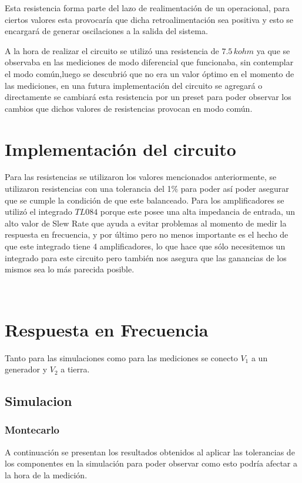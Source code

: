 	Esta resistencia forma parte del lazo de realimentación de un operacional, para ciertos valores esta provocaría que dicha retroalimentación sea positiva y esto se encargará de generar oscilaciones a la salida del sistema.
	
	A la hora de realizar el circuito se utilizó una resistencia de $7.5 \, k\si{ohm}$ ya que se observaba en las mediciones de modo diferencial que funcionaba, sin contemplar el modo común,luego se descubrió que no era un valor óptimo en el momento de las mediciones, en una futura implementación del circuito se agregará o directamente se cambiará esta resistencia por un preset para poder observar los cambios que dichos valores de resistencias provocan en modo común.
	
\section{Implementación del circuito}
	Para las resistencias se utilizaron los valores mencionados anteriormente, se utilizaron resistencias con una tolerancia del 1$\%$ para poder así poder asegurar que se cumple la condición de que este balanceado.
	Para los amplificadores se utilizó el integrado $\mathit{TL084}$ porque este posee una alta impedancia de entrada, un alto valor de Slew Rate que ayuda a evitar problemas al momento de medir la respuesta en frecuencia, y por último pero no menos importante es el hecho de que este integrado tiene 4 amplificadores, lo que hace que sólo necesitemos un integrado para este circuito pero también nos asegura que las ganancias de los mismos sea lo más parecida posible.

\
\section{Respuesta en Frecuencia}
Tanto para las simulaciones como para las mediciones se conecto $V_1$ a un generador y $V_2$ a tierra.
\subsection{Simulacion}
\subsubsection{Montecarlo}

	A continuación se presentan los resultados obtenidos al aplicar las tolerancias de los componentes en la simulación para poder observar como esto podría afectar a la hora de la medición.
	
